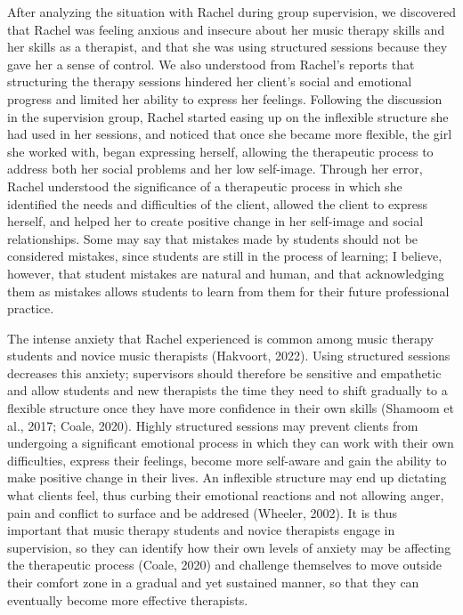 \documentclass[authordate, empirical, issue]{jote-new-article}
\begin{document}
After analyzing the situation with Rachel during group supervision, we discovered that Rachel was feeling anxious and insecure about her music therapy skills and her skills as a therapist, and that she was using structured sessions because they gave her a sense of control. We also understood from Rachel's reports that structuring the therapy sessions hindered her client's social and emotional progress and limited her ability to express her feelings. Following the discussion in the supervision group, Rachel started easing up on the inflexible structure she had used in her sessions, and noticed that once she became more flexible, the girl she worked with, began expressing herself, allowing the therapeutic process to address both her social problems and her low self-image. Through her error, Rachel understood the significance of a therapeutic process in which she identified the needs and difficulties of the client, allowed the client to express herself, and helped her to create positive change in her self-image and social relationships. Some may say that mistakes made by students should not be considered mistakes, since students are still in the process of learning; I believe, however, that student mistakes are natural and human, and that acknowledging them as mistakes allows students to learn from them for their future professional practice.



The intense anxiety that Rachel experienced is common among music therapy students and novice music therapists (Hakvoort, 2022). Using structured sessions decreases this anxiety; supervisors should therefore be sensitive and empathetic and allow students and new therapists the time they need to shift gradually to a flexible structure once they have more confidence in their own skills (Shamoom et al., 2017; Coale, 2020). Highly structured sessions may prevent clients from undergoing a significant emotional process in which they can work with their own difficulties, express their feelings, become more self-aware and gain the ability to make positive change in their lives. An inflexible structure may end up dictating what clients feel, thus curbing their emotional reactions and not allowing anger, pain and conflict to surface and be addresed (Wheeler, 2002). It is thus important that music therapy students and novice therapists engage in supervision, so they can identify how their own levels of anxiety may be affecting the therapeutic process (Coale, 2020) and challenge themselves to move outside their comfort zone in a gradual and yet sustained manner, so that they can eventually become more effective therapists.
\end{document}
